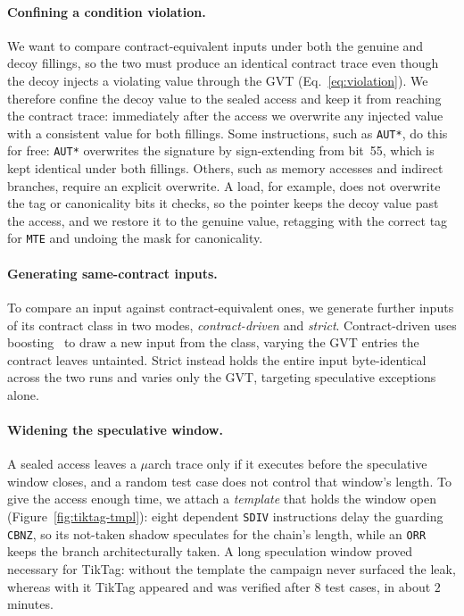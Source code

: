 \documentclass[letterpaper,twocolumn,10pt]{article}
\makeatletter
\theoremstyle{definition}
\def\uarch@bold#1#2\@nil{\if b#1\boldmath\fi}
\DeclareRobustCommand{\uarch}{{\expandafter\uarch@bold\f@series\@nil\ensuremath{\mu}}arch\xspace}
\makeatother
\begin{document}
\paragraph{Confining a condition violation.}
We want to compare contract-equivalent inputs under both the genuine and decoy fillings, so the
two must produce an identical contract trace even though the decoy injects a violating value
through the GVT (Eq.~\eqref{eq:violation}). We therefore confine the decoy value to the sealed
access and keep it from reaching the contract trace: immediately after the access we overwrite any
injected value with a consistent value for both fillings. Some instructions, such as \texttt{AUT*},
do this for free: \texttt{AUT*} overwrites the signature by sign-extending from bit~55, which is
kept identical under both fillings. Others, such as memory accesses and indirect branches, require
an explicit overwrite. A load, for example, does not overwrite the tag or canonicality bits it
checks, so the pointer keeps the decoy value past the access, and we restore it to the genuine
value, retagging with the correct tag for \texttt{MTE} and undoing the mask for canonicality.

\paragraph{Generating same-contract inputs.}
To compare an input against contract-equivalent ones, we generate further inputs of its contract
class in two modes, \emph{contract-driven} and \emph{strict}. Contract-driven uses boosting~\cite{hide_seek}
to draw a new input from the class, varying the GVT entries the contract leaves untainted. Strict
instead holds the entire input byte-identical across the two runs and varies only the GVT, targeting
speculative exceptions alone.
\paragraph{Widening the speculative window.}
A sealed access leaves a \uarch trace only if it executes before the speculative window closes, and
a random test case does not control that window's length. To give the access enough time, we attach
a \emph{template} that holds the window open (Figure~\ref{fig:tiktag-tmpl}): eight dependent
\texttt{SDIV} instructions delay the guarding \texttt{CBNZ}, so its not-taken shadow speculates for
the chain's length, while an \texttt{ORR} keeps the branch architecturally taken. A long speculation
window proved necessary for TikTag: without the template the campaign never surfaced the leak,
whereas with it TikTag appeared and was verified after $8$ test cases, in about $2$ minutes.
\end{document}
